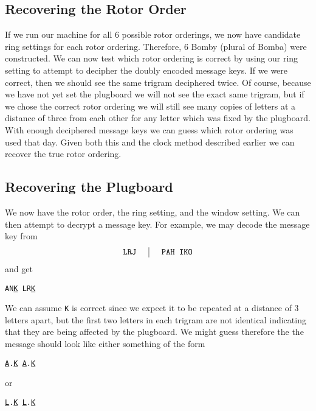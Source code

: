 \subsection{Recovering the Rotor Order}
If we run our machine for all $6$ possible rotor orderings, we now
have candidate ring settings for each rotor ordering. Therefore, $6$
Bomby (plural of Bomba) were constructed. We can now test
which rotor ordering is correct by using our ring setting to attempt
to decipher the doubly encoded message keys. If we were correct, then
we should see the same trigram deciphered twice. Of course, because
we have not yet set the plugboard we will not see the exact same
trigram, but if we chose the correct rotor ordering we will still see
many copies of letters at a distance of three from each other for any
letter which was fixed by the plugboard. With enough deciphered
message keys we can guess which rotor ordering was used that day.
Given both this and the clock method described earlier we can recover
the true rotor ordering.

\subsection{Recovering the Plugboard} \label{bomba_plugboard}
We now have the rotor order, the ring setting, and the window
setting. We can then attempt to decrypt a message key. For example,
we may decode the message key from
\[
  \setlength{\arraycolsep}{15pt}
  \begin{array}{c | c}
    \texttt{LRJ} & \texttt{PAH }\texttt{IKO} \\
  \end{array}
\]
and get
\begin{center}
  \texttt{AN}{\uline{\texttt{K}}}\texttt{ LR}{\uline{\texttt{K}}}
\end{center}
We can assume \texttt{K} is correct since we expect it to be repeated
at a distance of 3 letters apart, but the first two letters in each
trigram are not identical indicating that they are being affected by
the plugboard. We might guess therefore the the message should look
like either something of the form
\begin{center}
  {\uline{\texttt{A}}}\texttt{.}{\uline{\texttt{K}}}\texttt{
  }{\uline{\texttt{A}}}\texttt{.}{\uline{\texttt{K}}}
\end{center}
or
\begin{center}
  {\uline{\texttt{L}}}\texttt{.}{\uline{\texttt{K}}}\texttt{
  }{\uline{\texttt{L}}}\texttt{.}{\uline{\texttt{K}}}
\end{center}


